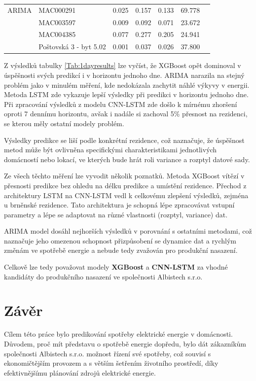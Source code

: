 \documentclass[FM,BP,fonts]{tulthesis}
\begin{document}
\begin{table}[!ht]
\begin{tabular}{lllllll}
		ARIMA           & MAC000291          & 0.025           &  0.157             & 0.133        &  69.778            \\ 
		~               & MAC003597          & 0.009            & 0.092             & 0.071            & 23.672             \\  
		~               & MAC004385          & 0.077            & 0.277             & 0.205           & 24.941             \\ 
		~               & Poštovská 3 - byt 5.02              & 0.001           & 0.037             & 0.026           & 37.800 \\   
		
		
	\end{tabular}
\end{table}

Z výsledků tabulky \ref{Tab:1dayresults} lze vyčíst, že XGBoost opět dominoval v úspěšnosti svých predikcí i v horizontu jednoho dne. ARIMA narazila na stejný problém jako v minulém měření, kde nedokázala zachytit náhlé výkyvy v energii. Metoda LSTM zde vykazuje lepší výsledky při predikci v horizontu jednoho dne. Při zpracování výsledků z modelu CNN-LSTM zde došlo k mírnému zhoršení oproti 7 dennímu horizontu, avšak i nadále si zachoval 5\% přesnost na rezidenci, se kterou měly ostatní modely problém.

Výsledky predikce se liší podle konkrétní rezidence, což naznačuje, že úspěšnost metod může být ovlivněna specifickými charakteristikami jednotlivých domácností nebo lokací, ve kterých bude hrát roli variance a rozptyl datové sady.

Ze všech těchto měření lze vyvodit několik poznatků. Metoda XGBoost vítězí v přesnosti predikce bez ohledu na délku predikce a umístění rezidence. Přechod z architektury LSTM na CNN-LSTM vedl k celkovému zlepšení výsledků, zejména u brněnské rezidence. Tato architektura je schopná lépe zpracovávat vstupní parametry a lépe se adaptovat na různé vlastnosti  (rozptyl, variance) dat. 

ARIMA model dosáhl nejhorších výsledků v porovnání s ostatními metodami, což naznačuje jeho omezenou schopnost přizpůsobení se dynamice dat a rychlým změnám ve spotřebě energie a nebude tedy zvažován pro produkční nasazení.

Celkově lze tedy považovat modely \textbf{XGBoost} a \textbf{CNN-LSTM} za vhodné kandidáty do produkčního nasazení ve společnosti Albistech s.r.o. 

\chapter{Závěr}
Cílem této práce bylo predikování spotřeby elektrické energie v domácnosti. Důvodem, proč mít představu o spotřebě energie dopředu, bylo dát zákazníkům společnosti Albistech s.r.o. možnost řízení své spotřeby, což souvisí s ekonomičtějším provozem a s větším šetřením životního prostředí, díky efektivnějšímu plánování zdrojů elektrické energie.
\end{document}
